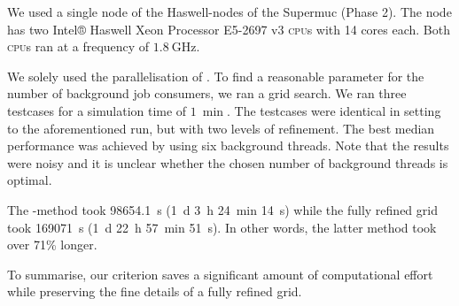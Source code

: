 We used a single node of the Haswell-nodes of the Supermuc (Phase 2).
The node has two Intel® Haswell Xeon Processor E5-2697 v3 \textsc{cpu}s with 14 cores each.
Both \textsc{cpu}s ran at a frequency of $\SI{1.8}{\GHz}$.

We solely used the \tbb{} parallelisation of \exahype{}.
To find a reasonable parameter for the number of background job consumers, we ran a grid search.
We ran three \amr{} testcases for a simulation time of $\SI{1}{\min}$.
The testcases were identical in setting to the aforementioned \amr{} run, but with two levels of refinement.
The best median performance was achieved by using six background threads.
Note that the results were noisy and it is unclear whether the chosen number of background threads is optimal.

The \amr{}-method took \SI{98654.1}{\s} (\SI{1}{\day} \SI{3}{\hour} \SI{24}{\minute} \SI{14}{\s})
while the fully refined grid took \SI{169071}{\s} (\SI{1}{\day} \SI{22}{\hour} \SI{57}{\minute} \SI{51}{\s}).
In other words, the latter method took over 71\% longer.

To summarise, our \amr{} criterion saves a significant amount of computational effort while preserving the fine details of a fully refined grid.
